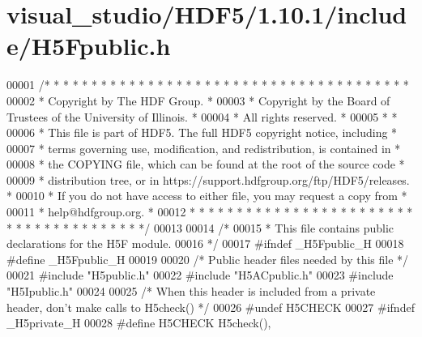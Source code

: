 \hypertarget{visual__studio_2_h_d_f5_21_810_81_2include_2_h5_fpublic_8h_source}{}\section{visual\+\_\+studio/\+H\+D\+F5/1.10.1/include/\+H5\+Fpublic.h}
\label{visual__studio_2_h_d_f5_21_810_81_2include_2_h5_fpublic_8h_source}

\begin{DoxyCode}
00001 \textcolor{comment}{/* * * * * * * * * * * * * * * * * * * * * * * * * * * * * * * * * * * * * * *}
00002 \textcolor{comment}{ * Copyright by The HDF Group.                                               *}
00003 \textcolor{comment}{ * Copyright by the Board of Trustees of the University of Illinois.         *}
00004 \textcolor{comment}{ * All rights reserved.                                                      *}
00005 \textcolor{comment}{ *                                                                           *}
00006 \textcolor{comment}{ * This file is part of HDF5.  The full HDF5 copyright notice, including     *}
00007 \textcolor{comment}{ * terms governing use, modification, and redistribution, is contained in    *}
00008 \textcolor{comment}{ * the COPYING file, which can be found at the root of the source code       *}
00009 \textcolor{comment}{ * distribution tree, or in https://support.hdfgroup.org/ftp/HDF5/releases.  *}
00010 \textcolor{comment}{ * If you do not have access to either file, you may request a copy from     *}
00011 \textcolor{comment}{ * help@hdfgroup.org.                                                        *}
00012 \textcolor{comment}{ * * * * * * * * * * * * * * * * * * * * * * * * * * * * * * * * * * * * * * */}
00013 
00014 \textcolor{comment}{/*}
00015 \textcolor{comment}{ * This file contains public declarations for the H5F module.}
00016 \textcolor{comment}{ */}
00017 \textcolor{preprocessor}{#ifndef \_H5Fpublic\_H}
00018 \textcolor{preprocessor}{#define \_H5Fpublic\_H}
00019 
00020 \textcolor{comment}{/* Public header files needed by this file */}
00021 \textcolor{preprocessor}{#include "H5public.h"}
00022 \textcolor{preprocessor}{#include "H5ACpublic.h"}
00023 \textcolor{preprocessor}{#include "H5Ipublic.h"}
00024 
00025 \textcolor{comment}{/* When this header is included from a private header, don't make calls to H5check() */}
00026 \textcolor{preprocessor}{#undef H5CHECK}
00027 \textcolor{preprocessor}{#ifndef \_H5private\_H}
00028 \textcolor{preprocessor}{#define H5CHECK          H5check(),}

\end{DoxyCode}
